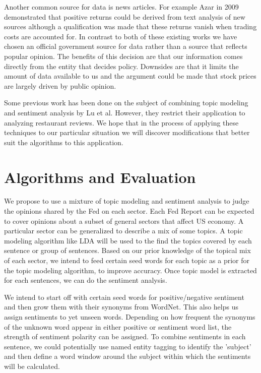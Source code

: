 \documentclass{sig-alternate-05-2015}
\begin{document}
Another common source for data is news articles. For example
Azar in 2009 demonstrated that positive returns could be derived
from text analysis of new sources although a qualification was made
that these returns vanish when trading costs are accounted for.\cite{azar:thesis} In 
contrast to both of these existing works we have chosen an official
government source for data rather than a source that reflects popular opinion.
The benefits of this decision are that our information comes directly from the
entity that decides policy. Downsides are that it limits the amount of data 
available to us and the argument could be made that stock prices are largely
driven by public opinion.

Some previous work has been done on the subject of combining topic modeling and
sentiment analysis by Lu et al.\cite{lu:2011} However, they restrict their application to analyzing
restaurant reviews. We hope that in the process of applying these techniques to our
particular situation we will discover modifications that better suit the algorithms
to this application.

\section{Algorithms and Evaluation}
We propose to use a mixture of topic modeling and sentiment analysis to judge the opinions shared by the Fed on each sector. Each Fed Report can be expected to cover opinions about a subset of  general sectors that affect US economy. A particular sector can be generalized to describe a  mix of some topics.  A topic modeling algorithm like LDA\cite{blei:lda} will be used to  the find the topics covered by each sentence or group of sentences. Based on our prior knowledge of the topical mix of each sector, we intend to feed certain seed words for each topic as a  prior for the topic modeling algorithm, to improve accuracy. Once topic model is extracted for each sentences, we can do the sentiment analysis.
 
We intend to start off with certain seed words for positive/negative sentiment and then grow them with their synonyms from WordNet\cite{kim:dso}. This  also helps us assign sentiments to yet unseen words. Depending on how frequent the synonyms of the unknown word appear in either positive or sentiment word list, the strength of sentiment polarity can be assigned. To combine sentiments in each sentence, we could potentially use named entity tagging to identify the 'subject' and then define a word window around the subject within which the sentiments will be calculated.
\end{document}
